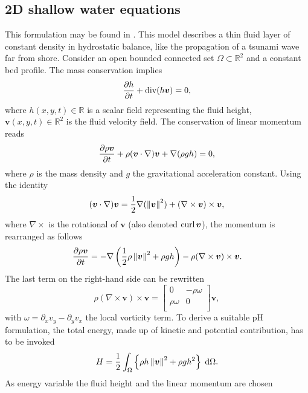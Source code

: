 \subsection{2D shallow water equations}\label{sec:shallowwater}
This formulation may be found in \cite[Section 6.2.]{cardoso2016}. This model describes a thin fluid layer of constant density in hydrostatic balance, like the propagation of a tsunami wave far from shore. Consider an open bounded connected set $\Omega \subset \mathbb{R}^2$ and a constant bed profile. The mass conservation implies
\begin{equation*}
\diffp{h}{t} + \div(h\bm{v}) = 0,
\end{equation*}
where $h(x,y,t) \in \mathbb{R}$ is a scalar field representing the fluid height, $\bm{v}(x,y,t) \in \mathbb{R}^2$ is the fluid velocity field. The conservation of linear momentum reads
\begin{equation*}
\diffp{\rho\bm{v}}{t} + \rho (\bm{v} \cdot \nabla) \bm{v} + \nabla(\rho g h) = 0,
\end{equation*}
where $\rho$ is the mass density and $g$ the gravitational acceleration constant. Using the identity
\begin{equation*}
(\bm{v} \cdot \nabla) \bm{v} = \frac{1}{2} \nabla(\left\|\bm{v}\right\|^2)  + (\nabla \times \bm{v}) \times \bm{v}, 
\end{equation*}
where $\nabla \times$ is the rotational of $\bm{v}$ (also denoted $\operatorname*{curl} \bm{v}$), the momentum is rearranged as follows
\begin{equation*}
\diffp{\rho \bm{v}}{t} = -\nabla\left(\frac{1}{2}\rho \norm{\bm{v}}^2 + \rho g h\right) - \rho (\nabla \times \bm{v}) \times \bm{v}.
\end{equation*}
The last term on the right-hand side can be rewritten
\begin{equation*}
\rho (\nabla \times \bm{v}) \times \bm{v} =   
\begin{bmatrix}
0 & -\rho\omega \\
\rho\omega & 0 \\
\end{bmatrix}
\bm{v},
\end{equation*}
with $\omega = \partial_x v_y - \partial_y v_x$ the local vorticity term. To derive a suitable pH formulation, the total energy, made up of kinetic and potential contribution, has to be invoked
\begin{equation*}
H = \energy{\rho h \norm{\bm{v}}^2 + \rho g h^2}.
\end{equation*}
As energy variable the fluid height and the linear momentum are chosen
